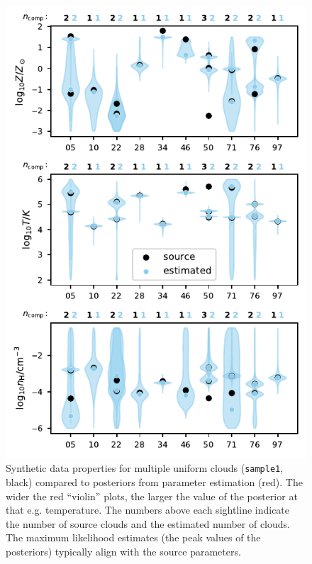 \documentclass[fleqn,usenatbib]{mnras}
\begin{document}
\begin{figure}
    \centering
    \includegraphics[width=\columnwidth]{figures/sample1/comparison.pdf}
    \caption{
    Synthetic data properties for multiple uniform clouds (\texttt{sample1}, black) compared to posteriors from parameter estimation (red).
    The wider the red ``violin'' plots, the larger the value of the posterior at that e.g. temperature.
    The numbers above each sightline indicate the number of source clouds and the estimated number of clouds.
    The maximum likelihood estimates (the peak values of the posteriors) typically align with the source parameters.
    }
    \label{f: sample1 violin}
\end{figure}
\end{document}
